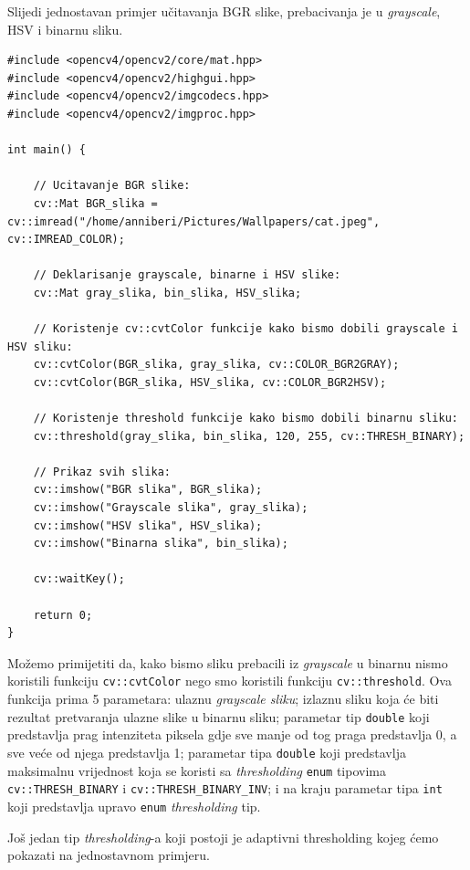 \documentclass[a4paper, 12pt]{article}
\begin{document}
Slijedi jednostavan primjer učitavanja BGR slike, prebacivanja je u \textit{grayscale}, HSV i binarnu sliku.

\begin{lstlisting}
#include <opencv4/opencv2/core/mat.hpp>
#include <opencv4/opencv2/highgui.hpp>
#include <opencv4/opencv2/imgcodecs.hpp>
#include <opencv4/opencv2/imgproc.hpp>

int main() {

    // Ucitavanje BGR slike:
    cv::Mat BGR_slika = cv::imread("/home/anniberi/Pictures/Wallpapers/cat.jpeg", cv::IMREAD_COLOR);

    // Deklarisanje grayscale, binarne i HSV slike:
    cv::Mat gray_slika, bin_slika, HSV_slika;

    // Koristenje cv::cvtColor funkcije kako bismo dobili grayscale i HSV sliku:
    cv::cvtColor(BGR_slika, gray_slika, cv::COLOR_BGR2GRAY);
    cv::cvtColor(BGR_slika, HSV_slika, cv::COLOR_BGR2HSV);

    // Koristenje threshold funkcije kako bismo dobili binarnu sliku:
    cv::threshold(gray_slika, bin_slika, 120, 255, cv::THRESH_BINARY);

    // Prikaz svih slika:
    cv::imshow("BGR slika", BGR_slika);
    cv::imshow("Grayscale slika", gray_slika);
    cv::imshow("HSV slika", HSV_slika);
    cv::imshow("Binarna slika", bin_slika);

    cv::waitKey();

    return 0;
}
\end{lstlisting}

Možemo primijetiti da, kako bismo sliku prebacili iz \textit{grayscale} u binarnu nismo koristili funkciju \lstinline{cv::cvtColor} nego smo koristili funkciju \lstinline{cv::threshold}. Ova funkcija prima 5 parametara: ulaznu \textit{grayscale sliku}; izlaznu sliku koja će biti rezultat pretvaranja ulazne slike u binarnu sliku; parametar tip \lstinline{double} koji predstavlja prag intenziteta piksela gdje sve manje od tog praga predstavlja 0, a sve veće od njega predstavlja 1; parametar tipa \lstinline{double} koji predstavlja maksimalnu vrijednost koja se koristi sa \textit{thresholding} \lstinline{enum} tipovima \lstinline{cv::THRESH_BINARY} i \lstinline{cv::THRESH_BINARY_INV}; i na kraju parametar tipa \lstinline{int} koji predstavlja upravo \lstinline{enum} \textit{thresholding} tip.

Još jedan tip \textit{thresholding}-a koji postoji je adaptivni thresholding kojeg ćemo pokazati na jednostavnom primjeru.
\end{document}
